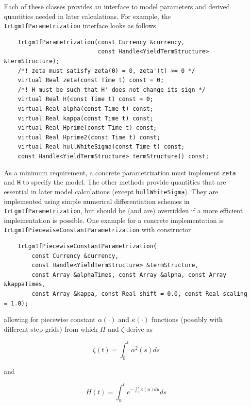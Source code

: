 \documentclass[12pt, a4paper]{article}
\begin{document}
Each of these classes provides an interface to model parameters and derived quantities needed in later calculations. For example, the \verb+IrLgm1fParametrization+ interface looks as follows

\medskip
\scriptsize
\begin{verbatim}
    IrLgm1fParametrization(const Currency &currency,
                           const Handle<YieldTermStructure> &termStructure);
    /*! zeta must satisfy zeta(0) = 0, zeta'(t) >= 0 */
    virtual Real zeta(const Time t) const = 0;
    /*! H must be such that H' does not change its sign */
    virtual Real H(const Time t) const = 0;
    virtual Real alpha(const Time t) const;
    virtual Real kappa(const Time t) const;
    virtual Real Hprime(const Time t) const;
    virtual Real Hprime2(const Time t) const;
    virtual Real hullWhiteSigma(const Time t) const;
    const Handle<YieldTermStructure> termStructure() const;
\end{verbatim}
\normalsize
\medskip

As a minimum requirement, a concrete parametrization must implement \verb+zeta+ and \verb+H+ to specify the model. The other methods provide quantities that are essential in later model calculations (except \verb+hullWhiteSigma+). They are implemented using simple numerical differentiation schemes in \verb+IrLgm1fParametrization+, but should be (and are) overridden if a more efficient implementation is possible. One example for a concrete implementation is \verb+IrLgm1fPiecewiseConstantParametrization+ with constructor

\medskip
\scriptsize
\begin{verbatim}
    IrLgm1fPiecewiseConstantParametrization(
        const Currency &currency,
        const Handle<YieldTermStructure> &termStructure,
        const Array &alphaTimes, const Array &alpha, const Array &kappaTimes,
        const Array &kappa, const Real shift = 0.0, const Real scaling = 1.0);
\end{verbatim}
\normalsize
\medskip

allowing for piecewise constant $\alpha(\cdot)$ and $\kappa(\cdot)$ functions (possibly with different step grids) from which $H$ and $\zeta$ derive as

\begin{equation}
\zeta(t) = \int_0^t \alpha^2(s) ds
\end{equation}

and

\begin{equation}
H(t) = \int_0^t e^{-\int_0^s \kappa(u) du} ds
\end{equation}
\end{document}
